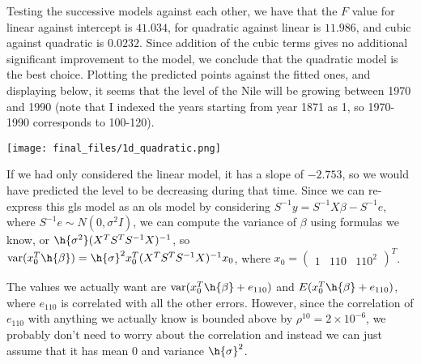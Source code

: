 \documentclass{article}
\newcommand{\openm}{\begin{pmatrix}}
\newcommand{\closem}{\end{pmatrix}}
\DeclareMathOperator{\var}{var}
\begin{document}
Testing the successive models against each other, we have that the $F$ value for linear against intercept is $41.034$, for quadratic against linear is $11.986$, and cubic against quadratic is $0.0232$. Since addition of the cubic terms gives no additional significant improvement to the model, we conclude that the quadratic model is the best choice.
Plotting the predicted points against the fitted ones, and displaying below, it seems that the level of the Nile will be growing between 1970 and 1990 (note that I indexed the years starting from year 1871 as 1, so 1970-1990 corresponds to 100-120). 

\texttt{[image: final\_files/1d\_quadratic.png]}

If we had only considered the linear model, it has a slope of $-2.753$, so we would have predicted the level to be decreasing during that time.
Since we can re-express this gls model as an ols model by considering $S^{-1}y=S^{-1}X\beta-S^{-1}e$, where $S^{-1}e\sim N(0,\sigma^2I)$, we can compute the variance of $\beta$ using formulas we know, or $\h{\sigma^2}(X^TS^TS^{-1}X)^{-1}$, so $\var(x_0^T\h{\beta})=\h{\sigma}^2x_0^T(X^TS^TS^{-1}X)^{-1}x_0$, where $x_0=\openm 1&110&110^2\closem^T$. 

The values we actually want are $\var(x_0^T\h{\beta}+e_{110})$ and $E(x_0^T\h{\beta}+e_{110})$, where $e_{110}$ is correlated with all the other errors. However, since the correlation of $e_{110}$ with anything we actually know is bounded above by $\rho^{10}=2\times10^{-6}$, we probably don't need to worry about the correlation and instead we can just assume that it has mean $0$ and variance $\h{\sigma}^2$. 
\end{document}

